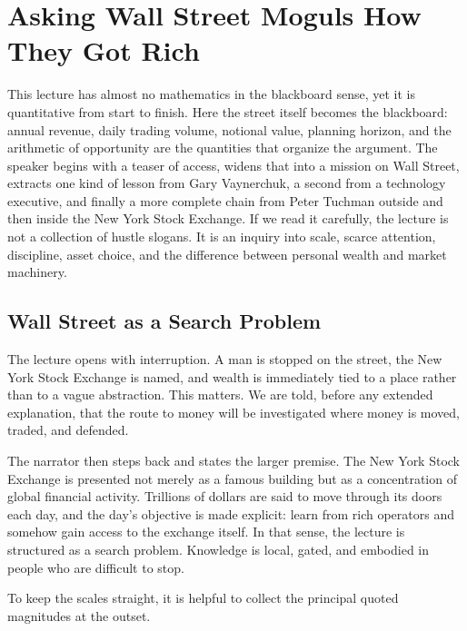 \chapter{Asking Wall Street Moguls How They Got Rich}

This lecture has almost no mathematics in the blackboard sense, yet it is quantitative from start to finish. Here the street itself becomes the blackboard: annual revenue, daily trading volume, notional value, planning horizon, and the arithmetic of opportunity are the quantities that organize the argument. The speaker begins with a teaser of access, widens that into a mission on Wall Street, extracts one kind of lesson from Gary Vaynerchuk, a second from a technology executive, and finally a more complete chain from Peter Tuchman outside and then inside the New York Stock Exchange. If we read it carefully, the lecture is not a collection of hustle slogans. It is an inquiry into scale, scarce attention, discipline, asset choice, and the difference between personal wealth and market machinery.

\section{Wall Street as a Search Problem}

The lecture opens with interruption. A man is stopped on the street, the New York Stock Exchange is named, and wealth is immediately tied to a place rather than to a vague abstraction. This matters. We are told, before any extended explanation, that the route to money will be investigated where money is moved, traded, and defended.

The narrator then steps back and states the larger premise. The New York Stock Exchange is presented not merely as a famous building but as a concentration of global financial activity. Trillions of dollars are said to move through its doors each day, and the day's objective is made explicit: learn from rich operators and somehow gain access to the exchange itself. In that sense, the lecture is structured as a search problem. Knowledge is local, gated, and embodied in people who are difficult to stop.

To keep the scales straight, it is helpful to collect the principal quoted magnitudes at the outset.

